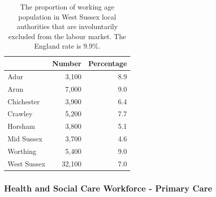 \begin{table}[hbt]
    \caption{The proportion of working age population in West Sussex local authorities that are involuntarily excluded from the labour market. The England rate is 9.9\%.}
    \centering
    \begin{tabular}{lrr}
    \toprule
    \ & Number & Percentage \\
    \midrule
    Adur & 3,100 & 8.9 \\
    Arun & 7,000 & 9.0 \\
    Chichester & 3,900 & 6.4\\
    Crawley & 5,200 & 7.7\\
    Horsham & 3,800 & 5.1\\
    Mid Sussex & 3,700 & 4.6\\
    Worthing & 5,400 & 9.0\\
    West Sussex & 32,100 & 7.0\\
    \bottomrule
    \end{tabular}
    \label{tab:wa:empdep}
\end{table}

\subsubsection{Health and Social Care Workforce - Primary Care}
